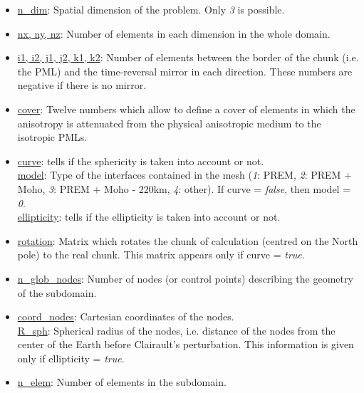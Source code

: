\begin{itemize}[topsep=2pt,itemsep=4pt]

\item\underline{n\_dim}: Spatial dimension of the problem. Only \textit{3} is possible.

\item\underline{nx, ny, nz}: Number of elements in each dimension in the whole domain.

\item\underline{i1, i2, j1, j2, k1, k2}: Number of elements between the border of the chunk (i.e. the PML) and the time-reversal mirror in each direction. These numbers are negative if there is no mirror.

\item\underline{cover}: Twelve numbers which allow to define a cover of elements in which the anisotropy is attenuated from the physical anisotropic medium to the isotropic PMLs.

\item\underline{curve}: tells if the sphericity is taken into account or not.\\
\underline{model}: Type of the interfaces contained in the mesh
(\textit{1}: PREM, \textit{2}: PREM + Moho, \textit{3}: PREM + Moho - 220km, \textit{4}: other).
If curve = \textit{false}, then model = \textit{0}.\\
\underline{ellipticity}: tells if the ellipticity is taken into account or not.

\item\underline{rotation}: Matrix which rotates the chunk of calculation (centred on the North
pole) to the real chunk. This matrix appears only if curve = \textit{true}.

\item\underline{n\_glob\_nodes}: Number of nodes (or control points) describing the geometry of the
subdomain.

\item\underline{coord\_nodes}: Cartesian coordinates of the nodes.\\
\underline{R\_sph}: Spherical radius of the nodes, i.e. distance of the nodes from the center of
the Earth before Clairault's perturbation. This information is given only if ellipticity =
\textit{true}.

\item\underline{n\_elem}: Number of elements in the subdomain.


\end{itemize}
